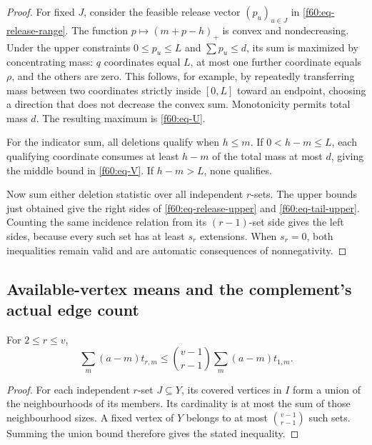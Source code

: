 \begin{proof}
For fixed $J$, consider the feasible release vector $(p_u)_{u\in J}$
in \eqref{f60:eq-release-range}.  The function
$p\mapsto(m+p-h)_+$ is convex and nondecreasing.  Under the upper
constraints $0\le p_u\le L$ and $\sum p_u\le d$, its sum is maximized
by concentrating mass: $q$ coordinates equal $L$, at most one further
coordinate equals $\rho$, and the others are zero.  This follows, for
example, by repeatedly transferring mass between two coordinates
strictly inside $[0,L]$ toward an endpoint, choosing a direction that
does not decrease the convex sum.  Monotonicity permits total mass $d$.
The resulting maximum is \eqref{f60:eq-U}.

For the indicator sum, all deletions qualify when $h\le m$.  If
$0<h-m\le L$, each qualifying coordinate consumes at least $h-m$ of
the total mass at most $d$, giving the middle bound in
\eqref{f60:eq-V}.  If $h-m>L$, none qualifies.

Now sum either deletion statistic over all independent $r$-sets.  The
upper bounds just obtained give the right sides of
\eqref{f60:eq-release-upper} and \eqref{f60:eq-tail-upper}.  Counting
the same incidence relation from its $(r-1)$-set side gives the left
sides, because every such set has at least $s_r$ extensions.  When
$s_r=0$, both inequalities remain valid and are automatic consequences
of nonnegativity.
\end{proof}

\subsection{Available-vertex means and the complement's actual edge count}
\label{f60:subsec-mean}

\begin{lemma}
\label{f60:lem-union}
For $2\le r\le v$,
\begin{equation}
 \sum_m(a-m)t_{r,m}
 \le\binom{v-1}{r-1}\sum_m(a-m)t_{1,m}.
 \label{f60:eq-union}
\end{equation}
\end{lemma}

\begin{proof}
For each independent $r$-set $J\subseteq Y$, its covered vertices in
$I$ form a union of the neighbourhoods of its members.  Its cardinality
is at most the sum of those neighbourhood sizes.  A fixed vertex of $Y$
belongs to at most $\binom{v-1}{r-1}$ such sets.  Summing the union bound
therefore gives the stated inequality.
\end{proof}

